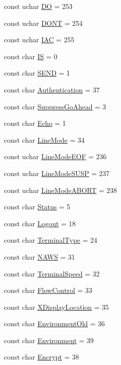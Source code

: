 \begin{DoxyCompactItemize}
\item 
const uchar \hyperlink{namespaceCommon_a680f5aa7bebdbbee557ce11edb635cb3}{DO} = 253
\item 
const uchar \hyperlink{namespaceCommon_ab8ecba25425f3bf116b3d82b48e546b0}{DONT} = 254
\item 
const uchar \hyperlink{namespaceCommon_a06e20b57f7564a1f62bcefa115d0c195}{IAC} = 255
\item 
const char \hyperlink{namespaceCommon_a08a2345f3481ac7dbe5b3a1d751f4824}{IS} = 0
\item 
const char \hyperlink{namespaceCommon_a897723bcf2aba172705240f146910355}{SEND} = 1
\item 
const char \hyperlink{namespaceCommon_a11fb5ff669cc07e7d705f1cd70cb6d8c}{Authentication} = 37
\item 
const char \hyperlink{namespaceCommon_a9c53b6b00cd382ab0ffdead6f19024d6}{SuppressGoAhead} = 3
\item 
const char \hyperlink{namespaceCommon_aa937da7001f7db82c85470dea163ea00}{Echo} = 1
\item 
const char \hyperlink{namespaceCommon_a214d2308bb455b60a95ff913615c7e9e}{LineMode} = 34
\item 
const uchar \hyperlink{namespaceCommon_a6edd4cd3ec1b63415bf6f9f5db9dce8f}{LineModeEOF} = 236
\item 
const uchar \hyperlink{namespaceCommon_a2fe681450f43d8682ce640d992517710}{LineModeSUSP} = 237
\item 
const uchar \hyperlink{namespaceCommon_ab373560f6dea410b14e62eec85969723}{LineModeABORT} = 238
\item 
const char \hyperlink{namespaceCommon_a38d2c077d41cef5287644f6605b4af1c}{Status} = 5
\item 
const char \hyperlink{namespaceCommon_a506856853df9fbd448dc5c5c049c8313}{Logout} = 18
\item 
const char \hyperlink{namespaceCommon_a9f04b2b701b3c0aa669a6c9fc6541e26}{TerminalType} = 24
\item 
const char \hyperlink{namespaceCommon_a4f9f0651e0a3ecc79de29a55ab9cf820}{NAWS} = 31
\item 
const char \hyperlink{namespaceCommon_a9651129748e1bb0947ce21f5b0abf02c}{TerminalSpeed} = 32
\item 
const char \hyperlink{namespaceCommon_a842ddcab0cc81f7e1ab007ce54a78202}{FlowControl} = 33
\item 
const char \hyperlink{namespaceCommon_aa07d7bc9e8e694b161a3bf254ec4a447}{XDisplayLocation} = 35
\item 
const char \hyperlink{namespaceCommon_a3dd92c3c9dd3d0240a864a64bb32f340}{EnvironmentOld} = 36
\item 
const char \hyperlink{namespaceCommon_a9f157cc434d5d42310b92994f7d04bf7}{Environment} = 39
\item 
const char \hyperlink{namespaceCommon_ae4b07bea4fd099c7ca59ba365dbcd91a}{Encrypt} = 38
\end{DoxyCompactItemize}


